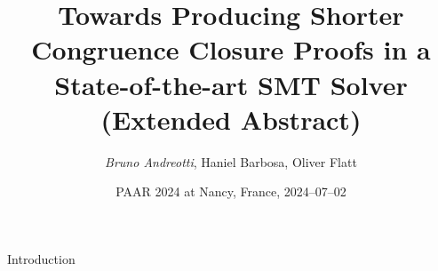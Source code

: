 \documentclass{beamer}
\title[]{Towards Producing Shorter Congruence Closure Proofs in a State-of-the-art SMT Solver (Extended Abstract)}
\author{\emph{Bruno Andreotti}, Haniel Barbosa, Oliver Flatt}
\institute{}
\date{PAAR 2024 at Nancy, France, 2024--07--02}
\begin{document}
\begin{frame}
  \titlepage
\end{frame}

\begin{frame}{Introduction}

\end{frame}
\end{document}
